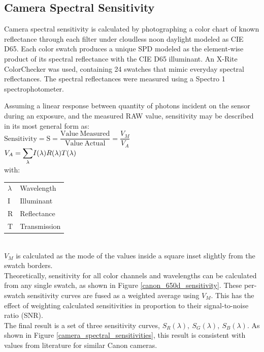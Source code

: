 \documentclass[twocolumn,10pt]{asme2ej}
\begin{document}
\subsection{Camera Spectral Sensitivity}

\noindent Camera spectral sensitivity is calculated by photographing a color chart of known reflectance through each filter under cloudless noon daylight modeled as CIE D65. Each color swatch produces a unique SPD modeled as the element-wise product of its spectral reflectance with the CIE D65 illuminant. An X-Rite ColorChecker was used, containing 24 swatches that mimic everyday spectral reflectances. The spectral reflectances were measured using a Spectro 1 spectrophotometer.

Assuming a linear response between quantity of photons incident on the sensor during an exposure, and the measured RAW value, sensitivity may be described in its most general form as:\\

$\mathrm{ Sensitivity = S = \dfrac{Value \ Measured}{Value \ Actual} } = \dfrac{V_M}{V_A}$ \\

$V_A = \mathlarger{\sum_{\lambda}} I(\lambda) R(\lambda) T(\lambda)$ \\

\noindent with: \\

\begin{tabular}{l | l}
$\lambda$ & Wavelength \\
I & Illuminant\\
R & Reflectance \\
T & Transmission \\
\end{tabular} \\

$V_M$ is calculated as the mode of the values inside a square inset slightly from the swatch borders.\\

Theoretically, sensitivity for all color channels and wavelengths can be calculated from any single swatch, as shown in Figure \ref{canon_650d_sensitivity}. These per-swatch sensitivity curves are fused as a weighted average using $V_M$. This has the effect of weighting calculated sensitivities in proportion to their signal-to-noise ratio (SNR). \\

The final result is a set of three sensitivity curves, $S_R(\lambda), \ S_G(\lambda), \ S_B(\lambda)$. As shown in Figure \ref{camera_spectral_sensitivities}, this result is consistent with values from literature for similar Canon cameras. \cite{Jiang}
\end{document}
